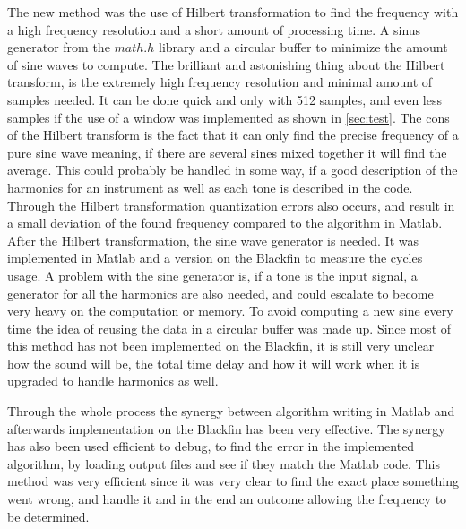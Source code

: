 The new method was the use of Hilbert transformation to find the frequency with a high frequency resolution and a short amount of processing time.
A sinus generator from the $math.h$ library and a circular buffer to minimize the amount of sine waves to compute.
The brilliant and astonishing thing about the Hilbert transform, is the extremely high frequency resolution and minimal amount of samples needed.
It can be done quick and only with 512 samples, and even less samples if the use of a window was implemented as shown in \cref{sec:test}.
The cons of the Hilbert transform is the fact that it can only find the precise frequency of a pure sine wave meaning, if there are several sines mixed together it will find the average.
This could probably be handled in some way, if a good description of the harmonics for an instrument as well as each tone is described in the code.
Through the Hilbert transformation quantization errors also occurs, and result in a small deviation of the found frequency compared to the algorithm in Matlab. 
After the Hilbert transformation, the sine wave generator is needed.
It was implemented in Matlab and a version on the Blackfin to measure the cycles usage.  
A problem with the sine generator is, if a tone is the input signal, a generator for all the harmonics are also needed, and could escalate to become very heavy on the computation or memory.
To avoid computing a new sine every time the idea of reusing the data in a circular buffer was made up. 
Since most of this method has not been implemented on the Blackfin, it is still very unclear how the sound will be, the total time delay and how it will work when it is upgraded to handle harmonics as well.

Through the whole process the synergy between algorithm writing in Matlab and afterwards implementation on the Blackfin has been very effective.
The synergy has also been used efficient to debug, to find the error in the implemented algorithm, by loading output files and see if they match the Matlab code.
This method was very efficient since it was very clear to find the exact place something went wrong, and handle it and in the end an outcome allowing the frequency to be determined.
